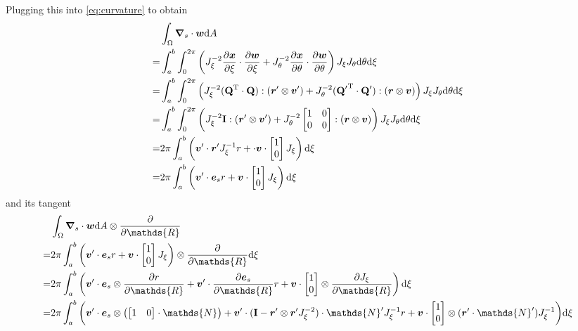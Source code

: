 \documentclass[a4paper,11pt]{article}
\renewcommand{\to}[1]{\text{\boldmath $#1$}} %
\newcommand{\ts}[1]{\text{\boldmath $\mathrm{#1}$}} %
\newcommand{\uv}[1]{\mathds{#1}}
\newcommand{\um}[1]{\mathds{#1}}
\newcommand{\intd}[1]{\mathrm{d}#1}
\newcommand{\pderiv}[2]{\frac{\partial#1}{\partial#2}}
\newcommand{\T}{\mathrm{T}}
\begin{document}
Plugging this into \eqref{eq:curvature} to obtain
\begin{align}
 &\int_\Omega\to \nabla_s\cdot\to w\intd A\\
=&\int_a^b\int_0^{2\pi}\left( J_\xi^{-2} \pderiv{\to x}{\xi}\cdot\pderiv{\to w}{\xi} +
                              J_\theta^{-2} \pderiv{\to x}{\theta}\cdot\pderiv{\to w}{\theta}
  \right) J_\xi J_\theta \intd \theta \intd \xi\\
=&\int_a^b\int_0^{2\pi}\left(
	  J_\xi^{-2} (\ts Q^\T\cdot\ts Q):(\to r'\otimes \to v') +
	  J_\theta^{-2} ({\ts Q'}^\T\cdot\ts Q'):(\to r\otimes\to v)
  \right) J_\xi J_\theta \intd \theta \intd \xi\\
=&\int_a^b\int_0^{2\pi}\left(
	  J_\xi^{-2} \ts I :(\to r'\otimes \to v') +
	  J_\theta^{-2} \begin{bmatrix}1&0\\0&0\end{bmatrix}:(\to r \otimes \to v)
  \right) J_\xi J_\theta \intd \theta \intd \xi\\
=&2\pi\int_a^b\left( \to v'\cdot \to r' J_\xi^{-1} r + \cdot \to v\cdot \begin{bmatrix}1\\0\end{bmatrix} J_\xi \right) \intd \xi\\
=&2\pi\int_a^b\left( \to v' \cdot \to e_s r + \to v \cdot \begin{bmatrix}1\\0\end{bmatrix} J_\xi \right) \intd \xi
\end{align}
and its tangent
\begin{align}
 &\int_\Omega\to \nabla_s\cdot\to w\intd A \otimes \pderiv{}{\uv R} \\
 =& 2\pi \int_a^b \left(
	\to v' \cdot \to e_s r + \to v\cdot \begin{bmatrix}1\\0\end{bmatrix} J_\xi
	\right)\otimes\pderiv{}{\uv R}\intd\xi\\
  =& 2\pi \int_a^b \left(
	\to v' \cdot \to e_s \otimes \pderiv{r}{\uv R} + \to v'\cdot \pderiv{\to e_s}{\uv R} r + \to v\cdot \begin{bmatrix}1\\0\end{bmatrix}\otimes\pderiv{J_\xi}{\uv R}
	\right)\intd\xi\\
  =& 2\pi \int_a^b \bigg(
	\to v' \cdot \to e_s \otimes\left(\begin{bmatrix}1&0\end{bmatrix}\cdot \um N\right) +
	\to v'\cdot (\ts I - \to r'\otimes \to r'J_\xi^{-2})\cdot \um N' J_\xi^{-1} r
	+\to v\cdot \begin{bmatrix}1\\0\end{bmatrix}\otimes (\to r'\cdot \um N')J_\xi^{-1}
	\bigg)\intd\xi
\end{align}
\end{document}
